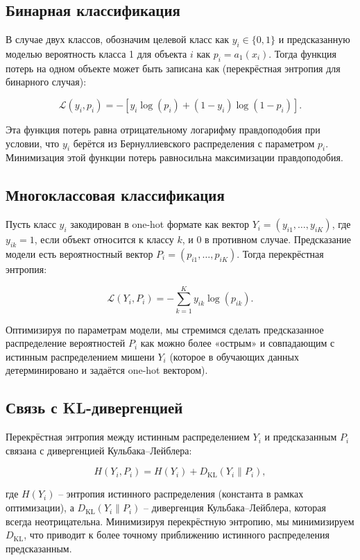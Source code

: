 \subsection*{Бинарная классификация}

В случае двух классов, обозначим целевой класс как $y_i \in \{0,1\}$ и предсказанную моделью вероятность класса 1 для объекта $i$ как $p_i = a_1(x_i)$. Тогда функция потерь на одном объекте может быть записана как (перекрёстная энтропия для бинарного случая):

$$
\mathcal{L}(y_i, p_i) = -\left[y_i\log(p_i) + (1 - y_i)\log(1 - p_i)\right].
$$

Эта функция потерь равна отрицательному логарифму правдоподобия при условии, что $y_i$ берётся из Бернуллиевского распределения с параметром $p_i$. Минимизация этой функции потерь равносильна максимизации правдоподобия.

\subsection*{Многоклассовая классификация}

Пусть класс $y_i$ закодирован в one-hot формате как вектор $Y_i = (y_{i1}, \dots, y_{iK})$, где $y_{ik} = 1$, если объект относится к классу $k$, и 0 в противном случае. Предсказание модели есть вероятностный вектор $P_i = (p_{i1}, \dots, p_{iK})$. Тогда перекрёстная энтропия:

$$
\mathcal{L}(Y_i, P_i) = -\sum_{k=1}^{K} y_{ik}\log(p_{ik}).
$$

Оптимизируя по параметрам модели, мы стремимся сделать предсказанное распределение вероятностей $P_i$ как можно более «острым» и совпадающим с истинным распределением мишени $Y_i$ (которое в обучающих данных детерминировано и задаётся one-hot вектором).

\subsection*{Связь с KL-дивергенцией}

Перекрёстная энтропия между истинным распределением $Y_i$ и предсказанным $P_i$ связана с дивергенцией Кульбака–Лейблера:

$$
H(Y_i, P_i) = H(Y_i) + D_{\text{KL}}(Y_i \| P_i),
$$

где $H(Y_i)$ – энтропия истинного распределения (константа в рамках оптимизации), а $D_{\text{KL}}(Y_i \| P_i)$ – дивергенция Кульбака–Лейблера, которая всегда неотрицательна. Минимизируя перекрёстную энтропию, мы минимизируем $D_{\text{KL}}$, что приводит к более точному приближению истинного распределения предсказанным.

